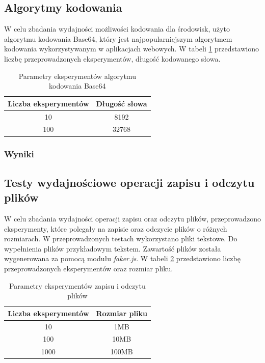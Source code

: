 \subsection{Algorytmy kodowania}
W celu zbadania wydajności możliwości kodowania dla środowisk, użyto algorytmu kodowania Base64, który jest najpopularniejszym algorytmem kodowania wykorzystywanym w aplikacjach webowych. W tabeli \ref{tab:encoding_experiments} przedstawiono liczbę przeprowadzonych eksperymentów, długość kodowanego słowa.

\begin{table}[H]
  \centering
  \caption{Parametry eksperymentów algorytmu kodowania Base64}
  \begin{tabular}{|c|c|}
    \hline
    \textbf{Liczba eksperymentów} & \textbf{Długość słowa}\\ \hline
    10 & 8192 \\ \hline
    100 & 32768 \\ \hline
  \end{tabular}
  \label{tab:encoding_experiments}
\end{table}

\subsubsection{Wyniki}

\subsection{Testy wydajnościowe operacji zapisu i odczytu plików}
W celu zbadania wydajności operacji zapisu oraz odczytu plików, przeprowadzono eksperymenty, które polegały na zapisie oraz odczycie plików o różnych rozmiarach. W przeprowadzonych testach wykorzystano pliki tekstowe. Do wypełnienia plików przykładowym tekstem. Zawartość plików została wygenerowana za pomocą modułu \textit{faker.js}. W tabeli \ref{tab:file_experiments} przedstawiono liczbę przeprowadzonych eksperymentów oraz rozmiar pliku.

\begin{table}[H]
  \centering
  \caption{Parametry eksperymentów zapisu i odczytu plików}
  \begin{tabular}{|c|c|}
    \hline
    \textbf{Liczba eksperymentów} & \textbf{Rozmiar pliku}\\ \hline
    10 & 1MB \\ \hline
    100 & 10MB \\ \hline
    1000 & 100MB \\ \hline
  \end{tabular}
  \label{tab:file_experiments}
\end{table}

